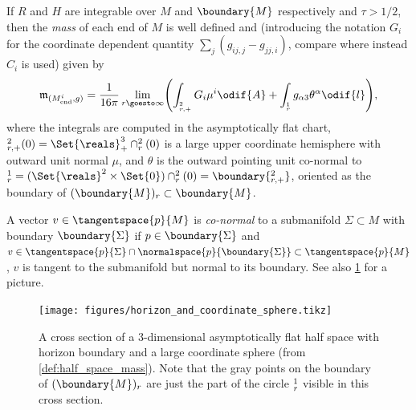 \documentclass[titlepage,numbers=noenddot,headinclude,oneside,%
footinclude=true,cleardoublepage=empty,%
BCOR=5mm,paper=a4,fontsize=11pt,%
english,%
]{scrartcl}
\let\sphere\relax
\newcommand{\sphere}{\mathbb{S}}
\newcommand{\mass}[2]{\mathfrak{m}_{(#1,#2)}} %
\begin{document}
\begin{definition}\label{def:half_space_mass}
    If \( R \) and \( H \) are integrable over \( M \) and \( \boundary{M} \) respectively and \( \tau>1/2 \), then the \emph{mass} of each end of \( M \) is well defined and (introducing the notation \( G_i \) for the coordinate dependent quantity \( \sum_j (g_{ij,j}-g_{jj,i}) \), compare \cite[text]{almarazPositiveMassTheorem2016} where instead \( C_i \) is used) given by
    \begin{equation*}
        \mass{M_{\mathrm{end}}^i}{g}=\frac{1}{16\pi}\lim_{r \goesto \infty}\Biggl(\int_{\sphere_{r,+}^{2}}G_i\mu^i\odif{A}+\int_{\sphere_r^{1}}g_{\alpha 3}\theta^\alpha\odif{l}\Biggr),
    \end{equation*}
    where the integrals are computed in the asymptotically flat chart, \( \sphere_{r,+}^{2}(0)=\Set{\reals}^3_+\cap \sphere_r^2(0) \) is a large upper coordinate hemisphere with outward unit normal \( \mu \), and \( \theta \) is the outward pointing unit co-normal to \( \sphere_{r}^1=(\Set{\reals}^2\times \Set{0})\cap \sphere_r^2(0)=\boundary{\sphere_{r,+}^2} \), oriented as the boundary of \( (\boundary{M})_r\subset \boundary{M} \).
\end{definition}
\begin{remark}\label{def:co-normal_vector}
    A vector \( v\in \tangentspace{p}{M} \) is \emph{co-normal} to a submanifold \( \Sigma\subset M \) with boundary \( \boundary{\Sigma} \) if \( p\in \boundary{\Sigma} \) and \( v\in \tangentspace{p}{\Sigma}\cap \normalspace{p}{\boundary{\Sigma}}\subset \tangentspace{p}{M} \), \ie \( v \) is tangent to the submanifold but normal to its boundary. See also \cref{fig:horizon_and_coordinate_sphere} for a picture.
\end{remark}
\begin{figure}[H]
    \centering
    \texttt{[image: figures/horizon\_and\_coordinate\_sphere.tikz]}
    \caption{A cross section of a 3-dimensional asymptotically flat half space with horizon boundary and a large coordinate sphere (from \cref{def:half_space_mass}). Note that the gray points on the boundary of \( (\boundary{M})_r \) are just the part of the circle \( \sphere^1_r \) visible in this cross section.}
    \label{fig:horizon_and_coordinate_sphere}
\end{figure}
\end{document}
